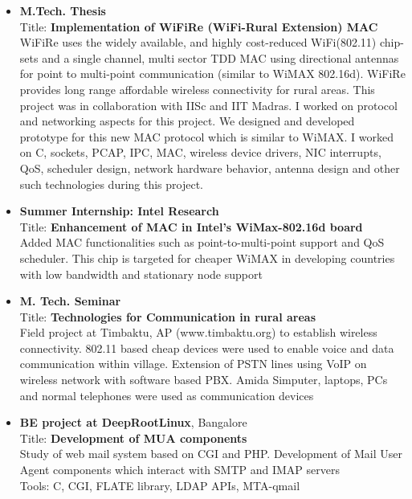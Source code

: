 \documentclass{res}
\begin{document}
\begin{resume}
\begin{itemize}
					  \item {\bf M.Tech. Thesis} \\
					  Title: {\bf Implementation of WiFiRe (WiFi-Rural Extension) MAC}\\
					  WiFiRe uses the widely available, and highly cost-reduced WiFi(802.11) chip-sets and a single channel, multi sector TDD MAC using directional antennas for point to multi-point communication (similar to WiMAX 802.16d). WiFiRe provides long range affordable wireless connectivity for rural areas. This project was in collaboration with IISc and IIT Madras. I worked on protocol and networking aspects for this project. We designed and developed prototype for this new MAC protocol which is similar to WiMAX. I worked on C, sockets, PCAP, IPC, MAC, wireless device drivers, NIC interrupts, QoS, scheduler design, network hardware behavior, antenna design and other such technologies during this project.

	
					  \item {\bf Summer Internship: Intel Research}\\
					  Title: {\bf Enhancement of MAC in Intel’s WiMax-802.16d board}\\
					  Added MAC functionalities such as point-to-multi-point support and QoS scheduler. This chip is targeted for cheaper WiMAX in developing countries with low bandwidth and stationary node support

                     \item {\bf M. Tech. Seminar} \\
					 Title: {\bf Technologies for Communication in rural areas}\\
	Field project at Timbaktu, AP (www.timbaktu.org) to establish wireless connectivity. 802.11 based cheap devices were used to enable voice and data communication within village. Extension of PSTN lines using VoIP on wireless network with software based PBX. Amida Simputer, laptops, PCs and normal telephones were used as communication devices 

	                \item {\bf BE project at DeepRootLinux}, Bangalore\\
				Title: {\bf Development of MUA components} \\
				Study of web mail system based on CGI and PHP. Development of Mail User Agent components which interact with SMTP and IMAP servers\\
				Tools: C, CGI, FLATE library, LDAP APIs, MTA-qmail


\end{itemize}
\end{resume}
\end{document}
